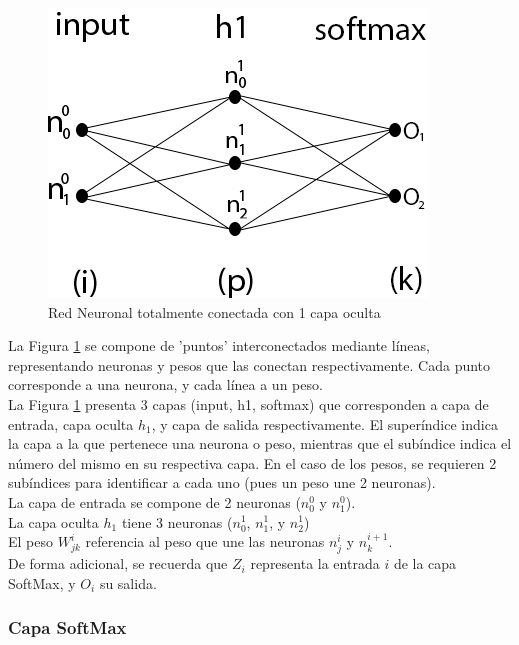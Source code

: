 \begin{figure}[H]
	\centering
	\includegraphics[scale=0.35]{imagenes/nn_1_capa.jpg}  
	\caption{Red Neuronal totalmente conectada con 1 capa oculta}
	\label{fig:nn_1_capa}
\end{figure}

La Figura \ref{fig:nn_1_capa} se compone de 'puntos' interconectados mediante líneas, representando neuronas y pesos que las conectan respectivamente. Cada punto corresponde a una neurona, y cada línea a un peso. \\
La Figura \ref{fig:nn_1_capa} presenta 3 capas (input, h1, softmax) que corresponden a capa de entrada, capa oculta $h_1$, y capa de salida respectivamente. El superíndice indica la capa a la que pertenece una neurona o peso, mientras que el subíndice indica el número del mismo en su respectiva capa. En el caso de los pesos, se requieren 2 subíndices para identificar a cada uno (pues un peso une 2 neuronas). \\
La capa de entrada se compone de 2 neuronas ($n^{0}_0$ y $n^{0}_1$). \\
La capa oculta $h_1$ tiene 3 neuronas ($n^1_{0}$, $n^1_{1}$, y $n^1_{2}$) \\
El peso $W^{i}_{jk}$ referencia al peso que une las neuronas $n^{i}_j$ y $n^{i+1}_k$.\\
De forma adicional, se recuerda que $Z_i$ representa la entrada $i$ de la capa SoftMax, y $O_i$ su salida.  

\subsubsection{Capa SoftMax}

